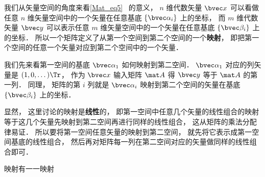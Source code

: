 
我们从矢量空间的角度来看\autoref{Mat_eq5}~ 的意义， $n$ 维代数矢量 $\bvec x$ 可以看做任意 $n$ 维矢量空间中的一个矢量在任意基底 $\{\bvec \alpha_i\}$ 上的坐标， 而 $m$ 维代数矢量 $\bvec y$ 可以表示任意 $m$ 维矢量空间中的一个矢量在任意基底 $\{\bvec \beta_i\}$ 上的坐标． 所以一个矩阵定义了从第一个空间到第二个空间的一个\textbf{映射}， 即把第一个空间的任意一个矢量对应到第二个空间中的一个矢量． 

我们先来看第一空间的基底 $\bvec \alpha_1$ 如何映射到第二空间． $\bvec\alpha_1$ 对应的列矢量是 $(1, 0, \dots)\Tr$， 作为 $\bvec x$ 输入矩阵 $\mat A$ 得 $\bvec y$ 等于 $\mat A$ 的第一列． 同理， 矩阵的第 $i$ 列就是 $\bvec\alpha_i$ 映射到第二个空间的矢量在基底 $\{\bvec \beta_i\}$ 上的坐标．

显然， 这里讨论的映射是\textbf{线性}的， 即第一空间中任意几个矢量的线性组合的映射等于这几个矢量先映射到第二空间再进行同样的线性组合， 这从矩阵的乘法分配律易证． 所以要将第一空间任意矢量的映射到第二空间， 就先将它表示成第一空间基底的线性组合， 然后再对矩阵每一列在第二空间对应的矢量做同样的线性组合即可．

映射有一一映射

